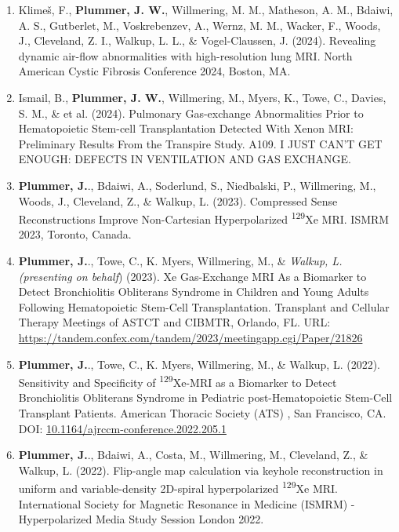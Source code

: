 \documentclass[12pt,]{scrartcl}
\begin{document}
\begin{enumerate}
  \item Klimeš, F., \textbf{Plummer, J. W.}, Willmering, M. M., Matheson, A. M., Bdaiwi, A. S., Gutberlet, M., Voskrebenzev, A., Wernz, M. M., Wacker, F., Woods, J., Cleveland, Z. I., Walkup, L. L., \& Vogel-Claussen, J. (2024). Revealing dynamic air-flow abnormalities with high-resolution lung MRI. North American Cystic Fibrosis Conference 2024, Boston, MA. 
  
  \item Ismail, B., \textbf{Plummer, J. W.}, Willmering, M., Myers, K., Towe, C., Davies, S. M., \& et al. (2024). Pulmonary Gas-exchange Abnormalities Prior to Hematopoietic Stem-cell Transplantation Detected With Xenon MRI: Preliminary Results From the Transpire Study. A109. I JUST CAN'T GET ENOUGH: DEFECTS IN VENTILATION AND GAS EXCHANGE.
  
  \item \textbf{Plummer, J.}., Bdaiwi, A., Soderlund, S., Niedbalski, P., Willmering, M., Woods, J., Cleveland, Z., \& Walkup, L. (2023). Compressed Sense Reconstructions Improve Non-Cartesian Hyperpolarized \textsuperscript{129}Xe MRI. ISMRM 2023, Toronto, Canada.
  
  \item \textbf{Plummer, J.}., Towe, C., K. Myers, Willmering, M., \&  \textit{Walkup, L. (presenting on behalf}) (2023). Xe Gas-Exchange MRI As a Biomarker to Detect Bronchiolitis Obliterans Syndrome in Children and Young Adults Following Hematopoietic Stem-Cell Transplantation. Transplant and Cellular Therapy Meetings of ASTCT and CIBMTR, Orlando, FL. URL: \href{https://tandem.confex.com/tandem/2023/meetingapp.cgi/Paper/21826}{https://tandem.confex.com/tandem/2023/meetingapp.cgi/Paper/21826}
  
  \item \textbf{Plummer, J.}., Towe, C., K. Myers, Willmering, M., \& Walkup, L. (2022). Sensitivity and Specificity of \textsuperscript{129}Xe-MRI as a Biomarker to Detect Bronchiolitis Obliterans Syndrome in Pediatric post-Hematopoietic Stem-Cell Transplant Patients. American Thoracic Society (ATS) , San Francisco, CA. DOI: \href{https://www.atsjournals.org/doi/abs/10.1164/ajrccm-conference.2022.205.1_MeetingAbstracts.A2181}{10.1164/ajrccm-conference.2022.205.1}
  
  \item \textbf{Plummer, J.}., Bdaiwi, A., Costa, M., Willmering, M., Cleveland, Z., \& Walkup, L. (2022). Flip-angle map calculation via keyhole reconstruction in uniform and variable-density 2D-spiral hyperpolarized \textsuperscript{129}Xe MRI. International Society for Magnetic Resonance in Medicine (ISMRM) - Hyperpolarized Media Study Session London 2022.
  

\end{enumerate}
\end{document}
